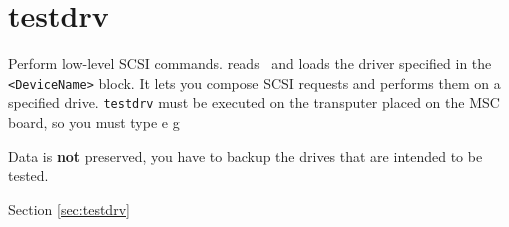 \section{testdrv}
\begin{man}
  \PP Perform low-level SCSI commands.
   reads \HEDI\ and loads the driver specified
             in the {\tt <DeviceName>} block. It lets you compose SCSI requests and 
             performs them on a specified drive. {\tt testdrv} must be executed on the 
             transputer placed on the MSC board, so you must type e g

             \bigskip
             \bigskip

             \begin{caution}
               Data is {\bf not} preserved, you have to backup the drives that are
               intended to be tested.
             \end{caution}
  \SA Section \ref{sec:testdrv}
\end{man}
